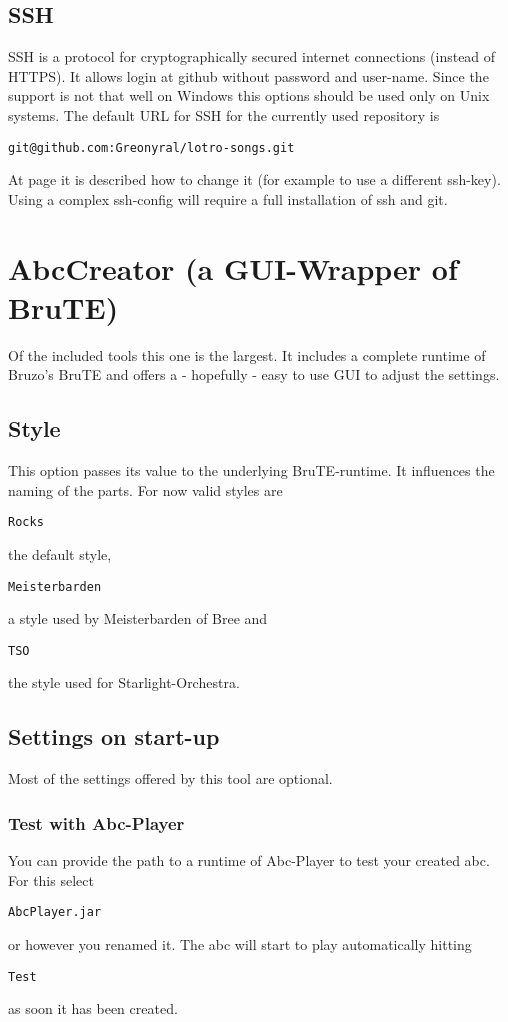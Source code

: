 \documentclass[10pt,a4paper,oneside]{article}
\begin{document}
\subsection{SSH}
SSH is a protocol for cryptographically secured internet connections (instead of HTTPS). It allows login at github without password and user-name. Since the support is not that well on Windows this options should be used only on Unix systems. The default URL for SSH for the currently used repository is \begin{verbatim}
git@github.com:Greonyral/lotro-songs.git
\end{verbatim} At page \pageref{configFile} it is described how to change it (for example to use a different ssh-key). Using a complex ssh-config will require a full installation of ssh and git.

\newpage
\section{AbcCreator (a GUI-Wrapper of BruTE)}
Of the included tools this one is the largest. It includes a complete runtime of Bruzo's BruTE and offers a - hopefully - easy to use GUI to adjust the settings.
\subsection{Style}
This option passes its value to the underlying BruTE-runtime. It influences the naming of the parts. For now valid styles are
\begin{verbatim}
Rocks
\end{verbatim} the default style,
\begin{verbatim}
Meisterbarden
\end{verbatim} a style used by Meisterbarden of Bree and
\begin{verbatim}
TSO
\end{verbatim} the style used for Starlight-Orchestra.

\subsection{Settings on start-up}
Most of the settings offered by this tool are optional.

\subsubsection{Test with Abc-Player}
You can provide the path to a runtime of Abc-Player to test your created abc. For this select
\begin{verbatim}
AbcPlayer.jar
\end{verbatim} or however you renamed it. The abc will start to play automatically hitting 
\begin{verbatim}
Test
\end{verbatim} as soon it has been created.
\end{document}
